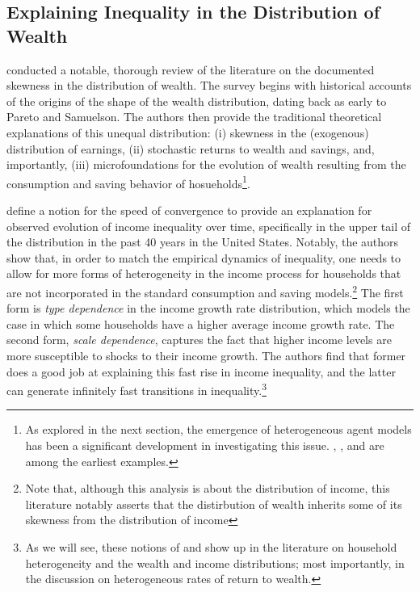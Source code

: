 \subsection{Explaining Inequality in the Distribution of Wealth}

\par \cite{jbab18} conducted a notable, thorough review of the literature on the documented skewness in the distribution of wealth. The survey begins with historical accounts of the origins of the shape of the wealth distribution, dating back as early to Pareto and Samuelson. The authors then provide the traditional theoretical explanations of this unequal distribution: (i) skewness in the (exogenous) distribution of earnings, (ii) stochastic returns to wealth and savings, and, importantly, (iii) microfoundations for the evolution of wealth resulting from the consumption and saving behavior of hosueholds\footnote{As explored in the next section, the emergence of heterogeneous agent models has been a significant development in investigating this issue. \cite{tb1983}, \cite{ra1994}, and \cite{mh1993} are among the earliest examples.}.

\par \cite{Gabaix2016} define a notion for the speed of convergence to provide an explanation for observed evolution of income inequality over time, specifically in the upper tail of the distribution in the past 40 years in the United States. Notably, the authors show that, in order to match the empirical dynamics of inequality, one needs to allow for more forms of heterogeneity in the income process for households that are not incorporated in the standard consumption and saving models.\footnote{Note that, although this analysis is about the distribution of income, this literature notably asserts that the distirbution of wealth inherits some of its skewness from the distribution of income} The first form is \textit{type dependence} in the income growth rate distribution, which models the case in which some households have a higher average income growth rate. The second form, \textit{scale dependence}, captures the fact that higher income levels are more susceptible to shocks to their income growth. The authors find that former does a good job at explaining this fast rise in income inequality, and the latter can generate infinitely fast transitions in inequality.\footnote{As we will see, these notions of  and  show up in the literature on household heterogeneity and the wealth and income distributions; most importantly, in the discussion on heterogeneous rates of return to wealth.} 

